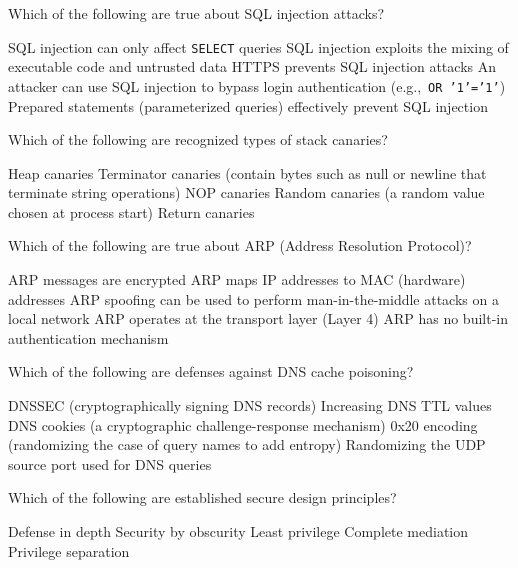 \documentclass[addpoints]{exam}
\begin{document}
\begin{questions}
\question Which of the following are true about SQL injection attacks?

\begin{checkboxes}
  \choice SQL injection can only affect \texttt{SELECT} queries
  \CorrectChoice SQL injection exploits the mixing of executable code and untrusted data
  \choice HTTPS prevents SQL injection attacks
  \CorrectChoice An attacker can use SQL injection to bypass login authentication (e.g.,\ \texttt{OR '1'='1'})
  \CorrectChoice Prepared statements (parameterized queries) effectively prevent SQL injection
\end{checkboxes}


\question Which of the following are recognized types of stack canaries?

\begin{checkboxes}
  \choice Heap canaries
  \CorrectChoice Terminator canaries (contain bytes such as null or newline that terminate string operations)
  \choice NOP canaries
  \CorrectChoice Random canaries (a random value chosen at process start)
  \choice Return canaries
\end{checkboxes}


\question Which of the following are true about ARP (Address Resolution Protocol)?

\begin{checkboxes}
  \choice ARP messages are encrypted
  \CorrectChoice ARP maps IP addresses to MAC (hardware) addresses
  \CorrectChoice ARP spoofing can be used to perform man-in-the-middle attacks on a local network
  \choice ARP operates at the transport layer (Layer 4)
  \CorrectChoice ARP has no built-in authentication mechanism
\end{checkboxes}


\question Which of the following are defenses against DNS cache poisoning?

\begin{checkboxes}
  \CorrectChoice DNSSEC (cryptographically signing DNS records)
  \choice Increasing DNS TTL values
  \CorrectChoice DNS cookies (a cryptographic challenge-response mechanism)
  \CorrectChoice 0x20 encoding (randomizing the case of query names to add entropy)
  \CorrectChoice Randomizing the UDP source port used for DNS queries
\end{checkboxes}



\question Which of the following are established secure design principles?

\begin{checkboxes}
  \CorrectChoice Defense in depth
  \choice Security by obscurity
  \CorrectChoice Least privilege
  \CorrectChoice Complete mediation
  \CorrectChoice Privilege separation
\end{checkboxes}



\end{questions}
\end{document}
